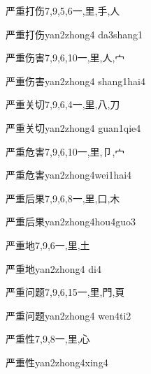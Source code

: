 \begin{Entry}{严重打伤}{7,9,5,6}{⼀,⾥,⼿,⼈}
  \begin{Phonetics}{严重打伤}{yan2zhong4 da3shang1}
  \end{Phonetics}
\end{Entry}

\begin{Entry}{严重伤害}{7,9,6,10}{⼀,⾥,⼈,⼧}
  \begin{Phonetics}{严重伤害}{yan2zhong4 shang1hai4}
  \end{Phonetics}
\end{Entry}

\begin{Entry}{严重关切}{7,9,6,4}{⼀,⾥,⼋,⼑}
  \begin{Phonetics}{严重关切}{yan2zhong4 guan1qie4}
  \end{Phonetics}
\end{Entry}

\begin{Entry}{严重危害}{7,9,6,10}{⼀,⾥,⼙,⼧}
  \begin{Phonetics}{严重危害}{yan2zhong4wei1hai4}
  \end{Phonetics}
\end{Entry}

\begin{Entry}{严重后果}{7,9,6,8}{⼀,⾥,⼝,⽊}
  \begin{Phonetics}{严重后果}{yan2zhong4hou4guo3}
  \end{Phonetics}
\end{Entry}

\begin{Entry}{严重地}{7,9,6}{⼀,⾥,⼟}
  \begin{Phonetics}{严重地}{yan2zhong4 di4}
  \end{Phonetics}
\end{Entry}

\begin{Entry}{严重问题}{7,9,6,15}{⼀,⾥,⾨,⾴}
  \begin{Phonetics}{严重问题}{yan2zhong4 wen4ti2}
  \end{Phonetics}
\end{Entry}

\begin{Entry}{严重性}{7,9,8}{⼀,⾥,⼼}
  \begin{Phonetics}{严重性}{yan2zhong4xing4}
  \end{Phonetics}
\end{Entry}

